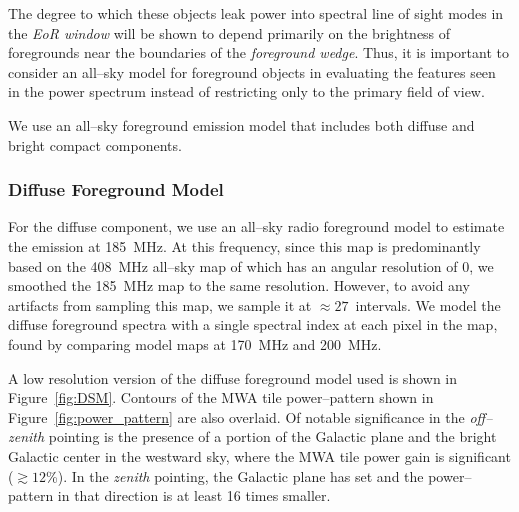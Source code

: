 \documentclass[preprint2,iop,numberedappendix]{emulateapj}
\begin{document}
The degree to which these objects leak power into spectral line of sight modes in the {\it EoR window} will be shown to depend primarily on the brightness of foregrounds near the boundaries of the {\it foreground wedge}. Thus, it is important to consider an all--sky model for foreground objects in evaluating the features seen in the power spectrum instead of restricting only to the primary field of view. 


We use an all--sky foreground emission model that includes both diffuse and bright compact components.  

\subsubsection{Diffuse Foreground Model}\label{sec:DSM}

For the diffuse component, we use an all--sky radio foreground model \citep{deo08} to estimate the emission at 185~MHz. At this frequency, since this map is predominantly based on the 408~MHz all--sky map of \citet{has82} which has an angular resolution of 0, we smoothed the 185~MHz map to the same resolution. However, to avoid any artifacts from sampling this map, we sample it at $\approx 27$\arcmin~intervals. We model the diffuse foreground spectra with a single spectral index at each pixel in the map, found by comparing model maps at 170~MHz and 200~MHz.

A low resolution version of the diffuse foreground model used is shown in Figure~\ref{fig:DSM}. Contours of the MWA tile power--pattern shown in Figure~\ref{fig:power_pattern} are also overlaid. Of notable significance in the {\it off--zenith} pointing is the presence of a portion of the Galactic plane and the bright Galactic center in the westward sky, where the MWA tile power gain is significant ($\gtrsim 12$\%). In the {\it zenith} pointing, the Galactic plane has set and the power--pattern in that direction is at least 16 times smaller. 
\end{document}
